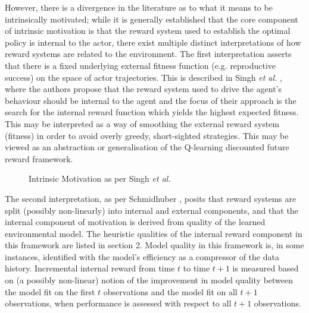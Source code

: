 \documentclass{article}
\begin{document}
However, there is a divergence in the literature as to what it means to be intrinsically motivated; while it is generally established that the core component of intrinsic motivation is that the reward system used to establish the optimal policy is internal to the actor, there exist multiple distinct interpretations of how reward systems are related to the environment. The first interpretation asserts that there is a fixed underlying external fitness function (e.g. reproductive success) on the space of actor trajectories. This is described in Singh \textit{et al.} \cite{singh2010intrinsically}, where the authors propose that the reward system used to drive the agent's behaviour should be internal to the agent and the focus of their approach is the search for the internal reward function which yields the highest expected fitness. This may be interpreted as a way of smoothing the external reward system (fitness) in order to avoid overly greedy, short-sighted strategies. This may be viewed as an abstraction or generalisation of the Q-learning discounted future reward framework.
 
\begin{figure}[h]
\centering
{}
\caption{Intrinsic Motivation as per Singh \textit{et al.}} \label{fig:M1}
\end{figure}

The second interpretation, as per Schmidhuber \cite{schmidhuber2010formal}, posits that reward systems are split (possibly non-linearly) into internal and external components, and that the internal component of motivation is derived from quality of the learned environmental model. The heuristic qualities of the internal reward component in this framework are listed in section 2. Model quality in this framework is, in some instances, identified with the model's efficiency as a compressor of the data history. Incremental internal reward from time $t$ to time $t+1$ is measured based on (a possibly non-linear) notion of the improvement in model quality between the model fit on the first $t$ observations and the model fit on all $t+1$ observations, when performance is assessed with respect to all $t+1$ observations.
\end{document}
